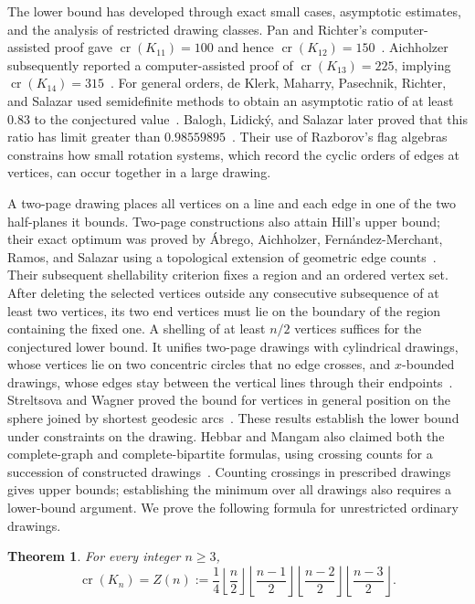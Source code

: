 \documentclass[11pt,a4paper]{article}
\newtheorem{theorem}{Theorem}[section]
\theoremstyle{remark}
\numberwithin{equation}{section}
\newcommand{\crn}{\operatorname{cr}}
\begin{document}
The lower bound has developed through exact small cases, asymptotic
estimates, and the analysis of restricted drawing classes. Pan and
Richter's computer-assisted proof gave $\crn(K_{11})=100$ and hence
$\crn(K_{12})=150$~\cite{PanRichter2007}. Aichholzer subsequently
reported a computer-assisted proof of $\crn(K_{13})=225$, implying
$\crn(K_{14})=315$~\cite{Aichholzer2021}.
For general orders, de Klerk, Maharry, Pasechnik, Richter, and Salazar
used semidefinite methods to obtain an asymptotic ratio of at least
$0.83$ to the conjectured value~\cite{deKlerkEtAl2006}.
Balogh, Lidick\'y, and Salazar later proved that this ratio has limit
greater than $0.98559895$~\cite[Theorem~1]{BaloghLidickySalazar2019}.
Their use of Razborov's flag algebras~\cite{Razborov2007} constrains how
small rotation systems, which record the cyclic orders of edges at
vertices, can occur together in a large drawing.

A two-page drawing places all vertices on a line and each edge in one
of the two half-planes it bounds. Two-page constructions also attain
Hill's upper bound; their exact optimum was proved by {\'A}brego,
Aichholzer, Fern\'andez-Merchant, Ramos, and Salazar using a topological
extension of geometric edge counts~\cite{AbregoEtAl2013}.
Their subsequent shellability criterion fixes a region and an ordered
vertex set. After deleting the selected vertices outside any consecutive
subsequence of at least two vertices, its two end vertices must lie on
the boundary of the region containing the fixed one. A shelling of at
least $n/2$ vertices suffices for the conjectured lower bound.
It unifies two-page drawings with cylindrical drawings, whose vertices
lie on two concentric circles that no edge crosses, and $x$-bounded
drawings, whose edges stay between the vertical lines through their
endpoints~\cite{AbregoEtAl2014Shellable}.
Streltsova and Wagner proved the bound for vertices in general position
on the sphere joined by shortest geodesic arcs~\cite[Theorem~4]{StreltsovaWagner2025}.
These results establish the lower bound under constraints on the drawing.
Hebbar and Mangam also claimed both the complete-graph and
complete-bipartite formulas, using crossing counts for a succession
of constructed drawings~\cite[Theorems~1--3]{HebbarMangam2018}.
Counting crossings in prescribed drawings gives upper bounds;
establishing the minimum over all drawings also requires a lower-bound
argument.
We prove the following formula for unrestricted ordinary drawings.

\begin{theorem}\label{thm:main}
For every integer \(n\ge3\),
\[
\crn(K_n)=Z(n):=
\frac14\left\lfloor\frac n2\right\rfloor
\left\lfloor\frac{n-1}2\right\rfloor
\left\lfloor\frac{n-2}2\right\rfloor
\left\lfloor\frac{n-3}2\right\rfloor.
\]
\end{theorem}
\end{document}
